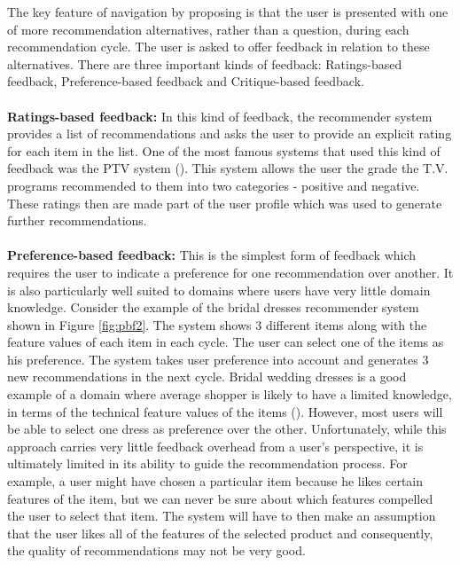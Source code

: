 The key feature of navigation by proposing is that the user is presented with one of more recommendation alternatives, rather than a question, during each recommendation cycle. 
The user is asked to offer feedback in relation to these alternatives.
There are three important kinds of feedback: Ratings-based feedback, Preference-based feedback and Critique-based feedback.\\
\\
\textbf{Ratings-based feedback:} In this kind of feedback, the recommender system provides a list of recommendations and  asks the user to provide an explicit rating for each item in the list.
One of the most famous systems that used this kind of feedback was the PTV system (\cite{smyth99tv}).
This system allows the user the grade the T.V. programs recommended to them into two categories - positive and negative. 
These ratings then are made part of the user profile which was used to generate further recommendations.\\
\\
\textbf{Preference-based feedback:} This is the simplest form of feedback which requires the user to indicate a preference for one recommendation over another. 
It is also particularly well suited to domains where users have very little domain knowledge.
Consider the example of the bridal dresses recommender system shown in Figure \ref{fig:pbf2}. 
The system shows 3 different items along with the feature values of each item in each cycle. 
The user can select one of the items as his preference.
The system takes user preference into account and generates 3 new recommendations in the next cycle.
Bridal wedding dresses is a good example of a domain where average shopper is likely to have a limited knowledge, in terms of the technical feature values of the items (\cite{smyth2007}).
However, most users will be able to select one dress as preference over the other.
Unfortunately, while this approach carries very little feedback overhead from a user’s perspective, it is ultimately limited in its ability to guide the recommendation process.
For example, a user might have chosen a particular item because he likes certain features of the item, but we can never be sure about which features compelled the user to select that item.
The system will have to then make an assumption that the user likes all of the features of the selected product and consequently, the quality of recommendations may not be very good.

